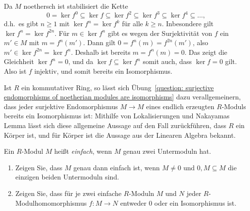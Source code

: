 \begin{solution}
  Da $M$ noethersch ist stabilisiert die Kette
  \[
              0
    =         \ker f^0
    \subseteq \ker f
    \subseteq \ker f^2
    \subseteq \ker f^3
    \subseteq \ker f^4
    \subseteq \dotso,
  \]
  d.h.\ es gibt $n \geq 1$ mit $\ker f^n = \ker f^k$ für alle $k \geq n$.
  Inbesondere gilt $\ker f^n = \ker f^{2n}$.
  Für $m \in \ker f^n$ gibt es wegen der Surjektivität von $f$ ein $m' \in M$ mit $m = f^n(m')$.
  Dann gilt $0 = f^n(m) = f^{2n}(m')$, also $m' \in \ker f^{2n} = \ker f^n$.
  Deshalb ist bereits $m = f^n(m) = 0$.
  Das zeigt die Gleichheit $\ker f^n = 0$, und da $\ker f \subseteq \ker f^n$ somit auch, dass $\ker f = 0$ gilt.
  Also ist $f$ injektiv, und somit bereits ein Isomorphismus.
\end{solution}


\begin{remark*}
  Ist $R$ ein kommutativer Ring, so lässt sich Übung~\ref{question: surjective endomorphisms of noetherian modules are isomorphisms} dazu verallgemeinern, dass jeder surjektive Endomorphismus $M \to M$ eines endlich erzeugten $R$-Moduls bereits ein Isomorphismus ist:
  Mithilfe von Lokalisierungen und Nakayamas Lemma lässt sich diese allgemeine Aussage auf den Fall zurückführen, dass $R$ ein Körper ist, und für Körper ist die Aussage aus der Linearen Algebra bekannt.
\end{remark*}


\begin{question}[subtitle = Ein Lemma von Schur]
  Ein $R$-Modul $M$ heißt \emph{einfach}, wenn $M$ genau zwei Untermoduln hat.
  \begin{enumerate}
    \item
      Zeigen Sie, dass $M$ genau dann einfach ist, wenn $M \neq 0$ und $0, M \subseteq M$ die einzigen beiden Untermoduln sind.
    \item
      Zeigen Sie, dass für je zwei einfache $R$-Moduln $M$ und $N$ jeder $R$-Mo\-dul\-ho\-mo\-mor\-phis\-mus $f \colon M \to N$ entweder $0$ oder ein Isomorphismus ist.
  \end{enumerate}
\end{question}


